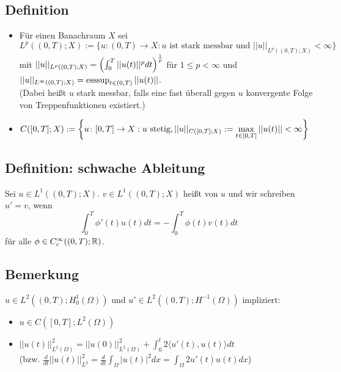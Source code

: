 \subsection{Definition}
\begin{itemize}
	\item Für einen Banachraum $X$ sei
	\[L^p((0,T);X) := \{ u \colon (0,T) \rightarrow X : u \text{ ist stark messbar und } ||u||_{L^p((0,T);X)} < \infty\} \]
	mit $||u||_{L^p((0,T);X)} = \enbrace*{ \int_{0}^{T} ||u(t)||^p dt}^{\frac{1}{p}}$ für $1 \leq p < \infty$ und $||u||_{L^\infty((0,T);X)} = \esssup_{t \in (0,T)} ||u(t)||$. \\
	(Dabei heißt $u$ stark messbar, falls eine fast überall gegen $u$ konvergente Folge von Treppenfunktionen existiert.)
	\item $C([0,T];X) := \penbrace*{ u\colon [0,T] \rightarrow X : u \text{ stetig}, ||u||_{C([0,T];X)} := \max\limits_{t \in [0,T]} ||u(t)|| < \infty}$
\end{itemize}

\subsection{Definition: schwache Ableitung}
	Sei $u \in L^1((0,T);X)$. $v \in L^1((0,T);X)$ heißt  von $u$ und wir schreiben $u' = v$, wenn
	\[ \int_{0}^{T} \phi'(t) u(t) dt = -\int_{0}^{T} \phi(t) v(t) dt \]
	für alle $\phi \in C_c^\infty ((0,T);\RR)$.
	
\subsection{Bemerkung}
	$u \in L^2((0,T);H_0^1(\Omega))$ und $u' \in L^2((0,T);H^{-1}(\Omega))$ impliziert: \begin{itemize}
		\item $u \in C([0,T];L^2(\Omega))$
		\item $||u(t)||_{L^2(\Omega)}^2 = ||u(0)||_{L^2(\Omega)}^2 + \int_0^t 2 \langle u'(t),u(t) \rangle dt$ \\
		(bzw. $\frac{d}{dt} ||u(t)||_{L^2}^2 = \frac{d}{dt} \int_{\Omega} |u(t)|^2 dx = \int_{\Omega} 2u'(t)u(t) dx$)
	\end{itemize}
	
